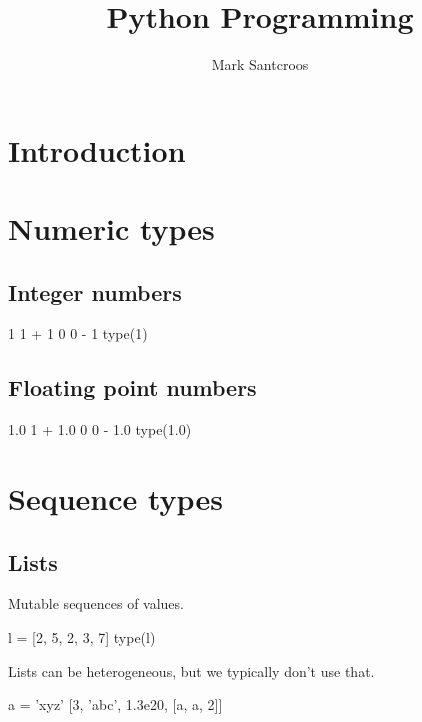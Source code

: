 \documentclass[aspectratio=1610,slidestop]{beamer}
\author{Mark Santcroos}
\title{Python Programming}
\begin{document}


\section{Introduction}

\section{Numeric types}
\subsection{Integer numbers}
\begin{pframe}
\begin{pyconsole}
1
1 + 1
0
0 - 1
type(1)
\end{pyconsole}

\end{pframe}

\subsection{Floating point numbers}
\begin{pframe}
\begin{pyconsole}
1.0
1 + 1.0
0
0 - 1.0
type(1.0)
\end{pyconsole}
\end{pframe}


\section{Sequence types}
\subsection{Lists}
\begin{pframe}
Mutable sequences of values.
\begin{pyconsole}
l = [2, 5, 2, 3, 7]
type(l)
\end{pyconsole}
\medskip
\medskip
Lists can be heterogeneous, but we typically don't use that.
\begin{pyconsole}
a = 'xyz'
[3, 'abc', 1.3e20, [a, a, 2]]
\end{pyconsole}
\end{pframe}
\end{document}
